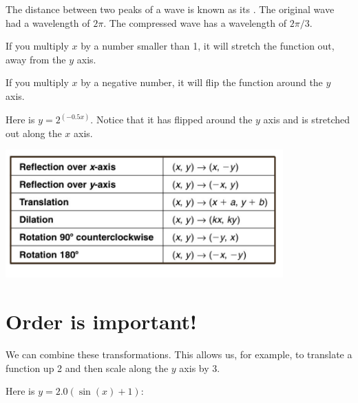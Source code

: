 The distance between two peaks of a wave is known as its
.  The original wave had a wavelength of $2\pi$.
The compressed wave has a wavelength of $2\pi/3$.

If you multiply $x$ by a number smaller than 1, it will stretch the function out, away from the $y$ axis.

If you multiply $x$ by a negative number, it will flip the function around the $y$ axis.

Here is $y = 2^{(-0.5x)}$. Notice that it has flipped around the $y$ axis and is stretched out along the $x$ axis.


\includegraphics[width=0.8\textwidth]{transformation_r.png}

\section{Order is important!}

We can combine these transformations. This allows us, for example, to
translate a function up 2 and then scale along the $y$ axis by 3.

Here is $y = 2.0 (\sin(x) + 1)$:

